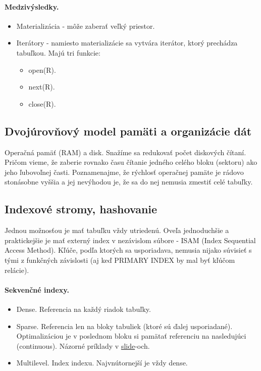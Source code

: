 \documentclass[10pt,a4paper]{article}
\begin{document}
\paragraph{Medzivýsledky.}
\begin{itemize}
\item Materializácia - môže zaberať veľký priestor.
\item Iterátory - namiesto materializácie sa vytvára iterátor, ktorý prechádza tabuľkou. Majú tri funkcie: 
\begin{itemize}
\item open(R).
\item next(R).
\item close(R). 
\end{itemize}
\end{itemize}

\subsection{Dvojúrovňový model pamäti a organizácie dát}

Operačná pamäť (RAM) a disk. Snažíme sa redukovať počet diskových čítaní. Pričom vieme, že zaberie rovnako času čítanie jedného celého bloku (sektoru) ako jeho ľubovoľnej časti. 
Poznamenajme, že rýchlosť operačnej pamäte je rádovo stonásobne vyššia a jej nevýhodou je, že sa do nej nemusia zmestiť celé tabuľky. 

\subsection{Indexové stromy, hashovanie}

Jednou možnosťou je mať tabuľku vždy utriedenú. Oveľa jednoduchšie a praktickejšie je mať externý index v nezávislom súbore - ISAM (Index Sequential Access Method).
Kľúče, podľa ktorých sa usporiadava, nemusia nijako súvisieť s tými z funkčných závislosti (aj keď PRIMARY INDEX by mal byť kľúčom relácie). 

\paragraph{Sekvenčné indexy.}
\begin{itemize}
\item Dense. Referencia na každý riadok tabuľky.
\item Sparse. Referencia len na bloky tabuliek (ktoré sú ďalej usporiadané). Optimalizáciou je v poslednom bloku si pamätať referenciu na nasledujúci (continuous). Názorné príklady v \href{http://www.dcs.fmph.uniba.sk/~plachetk/TEACHING/DB2011/db2011_10.pdf}{slide}-och. 
\item Multilevel. Index indexu. Najvnútornejší je vždy dense. 
\end{itemize}
\end{document}
